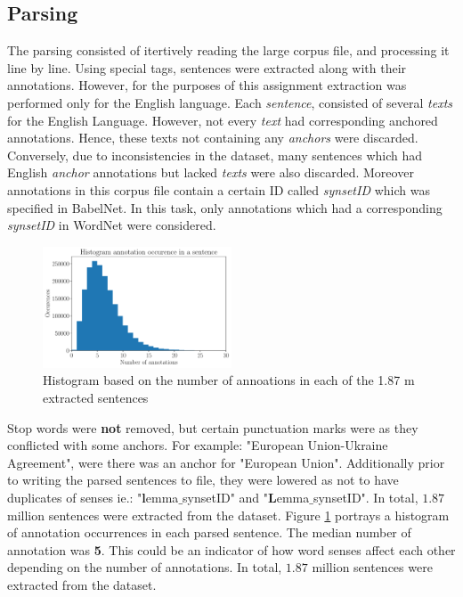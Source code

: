 \documentclass[12pt,a4paper]{article}
\begin{document}
\subsection{Parsing}
The parsing consisted of itertively reading the large corpus file, and processing it line by line. Using special tags, sentences were extracted along with their annotations. However, for the purposes of this assignment extraction was performed  only for the English language.
Each \textit{sentence}, consisted of several \textit{texts} for the English Language. However, not every \textit{text} had corresponding anchored annotations. Hence, these texts not containing any \textit{anchors} were discarded. Conversely, due to inconsistencies in the dataset, many sentences which had English \textit{anchor} annotations but lacked \textit{texts} were also discarded. Moreover annotations in this corpus file contain a certain ID called \textit{synsetID} which was specified in BabelNet. In this task, only annotations which had a corresponding \textit{synsetID} in WordNet were considered.
\begin{figure}
\includegraphics[width=0.5\textwidth, angle = 0]{img/annotations.pdf}
\caption{Histogram based on the number of annoations in each of the 1.87 m extracted sentences}
\vspace{-25pt}
\label{img:parsed}
\end{figure}
Stop words were \textbf{not} removed, but certain punctuation marks were as they conflicted with some anchors. For example: "European Union-Ukraine Agreement", were there was an anchor for "European Union". Additionally prior to writing the parsed sentences to file, they were lowered as not to have duplicates of senses  ie.:  "\textbf{l}emma$\_$synsetID" and "\textbf{L}emma$\_$synsetID".
In total, $1.87$ million sentences were extracted from the dataset. 
Figure \ref{img:parsed} portrays a histogram of annotation occurrences in each parsed sentence. The median number of annotation was \textbf{5}. This could be an indicator of how word senses affect each other depending on the number of annotations. In total, $1.87$ million sentences were extracted from the dataset.
\end{document}

